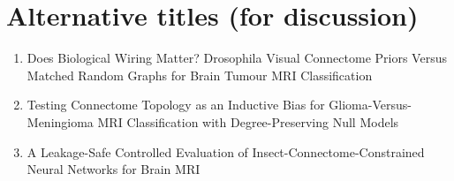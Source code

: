 \section*{Alternative titles (for discussion)}
\begin{enumerate}
\item Does Biological Wiring Matter? Drosophila Visual Connectome Priors Versus Matched Random Graphs for Brain Tumour MRI Classification
\item Testing Connectome Topology as an Inductive Bias for Glioma-Versus-Meningioma MRI Classification with Degree-Preserving Null Models
\item A Leakage-Safe Controlled Evaluation of Insect-Connectome-Constrained Neural Networks for Brain MRI
\end{enumerate}
